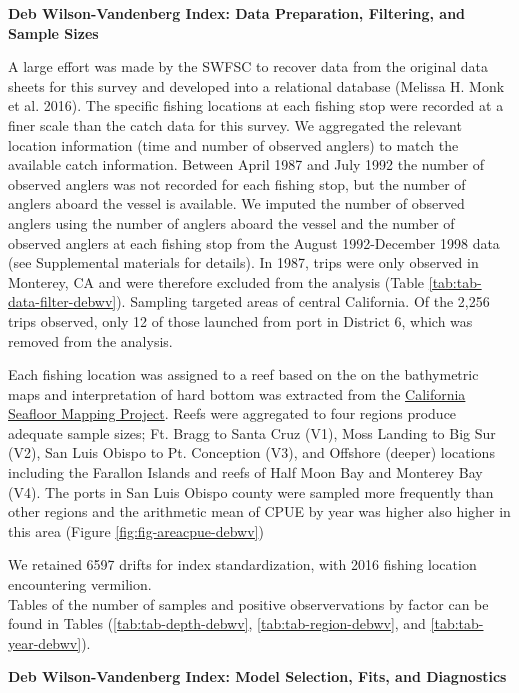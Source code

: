 \documentclass[11pt,
  english,
  a4paper,
]{article}
\begin{document}
\textbf{Deb Wilson-Vandenberg Index: Data Preparation, Filtering, and Sample Sizes}

A large effort was made by the SWFSC to recover data from the original data sheets for this survey and developed into a relational database {(Melissa H. Monk et al. 2016)\leavevmode\tagmcend\tagstructend}. The specific fishing locations at each fishing stop were recorded at a finer scale than the catch data for this survey. We aggregated the relevant location information (time and number of observed anglers) to match the available catch information. Between April 1987 and July 1992 the number of observed anglers was not recorded for each fishing stop, but the number of anglers aboard the vessel is available. We imputed the number of observed anglers using the number of anglers aboard the vessel and the number of observed anglers at each fishing stop from the August 1992-December 1998 data (see Supplemental materials for details). In 1987, trips were only observed in Monterey, CA and were therefore excluded from the analysis (Table \ref{tab:tab-data-filter-debwv}). Sampling targeted areas of central California. Of the 2,256 trips observed, only 12 of those launched from port in District 6, which was removed from the analysis.

Each fishing location was assigned to a reef based on the on the bathymetric maps and interpretation of hard bottom was extracted from the {\href{http://seafloor.otterlabs.org/index.html}{California Seafloor Mapping Project}\leavevmode\tagmcend\tagstructend}. Reefs were aggregated to four regions produce adequate sample sizes; Ft. Bragg to Santa Cruz (V1), Moss Landing to Big Sur (V2), San Luis Obispo to Pt. Conception (V3), and Offshore (deeper) locations including the Farallon Islands and reefs of Half Moon Bay and Monterey Bay (V4). The ports in San Luis Obispo county were sampled more frequently than other regions and the arithmetic mean of CPUE by year was higher also higher in this area (Figure \ref{fig:fig-areacpue-debwv})

We retained 6597 drifts for index standardization, with 2016 fishing location encountering vermilion.\\
Tables of the number of samples and positive observervations by factor can be found in Tables (\ref{tab:tab-depth-debwv}, \ref{tab:tab-region-debwv}, and \ref{tab:tab-year-debwv}).

\textbf{Deb Wilson-Vandenberg Index: Model Selection, Fits, and Diagnostics}
\end{document}
